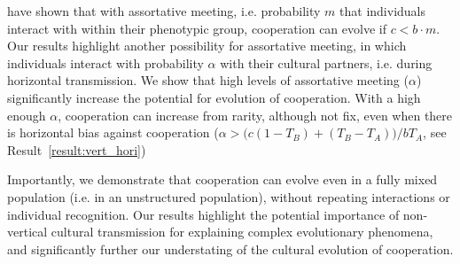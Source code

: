 \documentclass[12pt]{extarticle}
\begin{document}
{%
%

\citet{Eshel1982} have shown that with assortative meeting, i.e. probability $m$ that individuals interact with within their phenotypic group, cooperation can evolve if $c < b \cdot m$.
Our results highlight another possibility for assortative meeting, in which individuals interact with probability $\alpha$ with their cultural partners, i.e. during horizontal transmission.
We show that high levels of assortative meeting ($\alpha$) significantly increase the potential for evolution of cooperation. With a high enough $\alpha$, cooperation can increase from rarity, although not fix, even when there is horizontal bias against cooperation ($\alpha > \big(c(1-T_B) + (T_B-T_A)\big) / b T_A$, see Result~\autoref{result:vert_hori})

Importantly, we demonstrate that cooperation can evolve even in a fully mixed population (i.e. in an unstructured population), without repeating interactions or individual recognition.
Our results highlight the potential importance of non-vertical cultural transmission for explaining complex evolutionary phenomena, and significantly further our understating of the cultural evolution of cooperation. 



}
\end{document}
